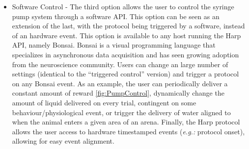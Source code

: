 \begin{itemize}
\item{Software Control} - The third option allows the user to control the syringe pump system through a software API. This option can be seen as an extension of the last, with the protocol being triggered by a software, instead of an hardware event. This option is available to any host running the Harp API, namely Bonsai. Bonsai is a visual programming language that specializes in asynchronous data acquisition and has seen growing adoption from the neuroscience community. Users can change an large number of settings (identical to the “triggered control” version) and trigger a protocol on any Bonsai event. As an example, the user can periodically deliver a constant amount of reward \ref{fig:PumpControl}, dynamically change the amount of liquid delivered on every trial, contingent on some behaviour/physiological event, or trigger the delivery of water aligned to when the animal enters a given area of an arena.
Finally, the Harp protocol allows the user access to hardware timestamped events (\textit{e.g.:} protocol onset), allowing for easy event alignment.


\end{itemize}
